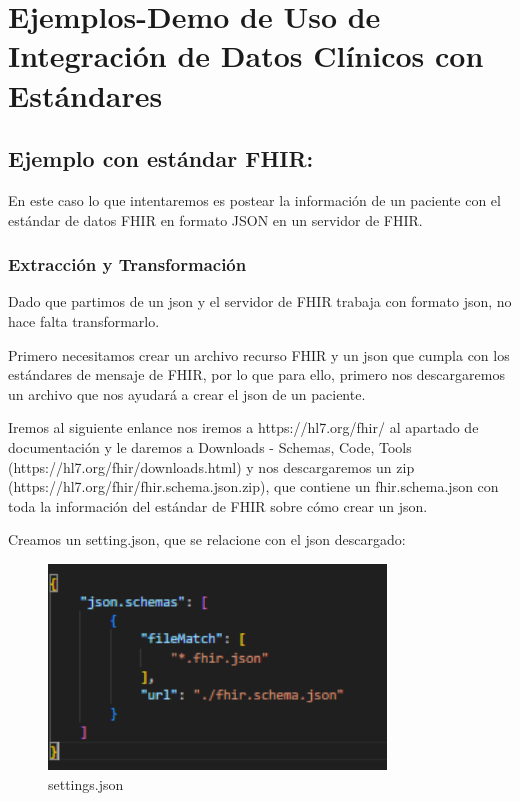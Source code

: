 \documentclass[12pt, a4paper, twoside]{article}
\begin{document}
	
	\section{Ejemplos-Demo de Uso de Integración de Datos Clínicos con Estándares}
	
	
	\subsection{Ejemplo con estándar  FHIR:}
	En este caso lo que intentaremos es postear la información de un paciente con el estándar de datos FHIR en formato JSON en un servidor de  FHIR.
	
	\subsubsection{Extracción y Transformación}
	Dado que partimos de un json y el servidor de FHIR trabaja con formato json, no hace falta transformarlo.
	
	Primero necesitamos crear un archivo recurso FHIR y un json que cumpla con los estándares de mensaje de FHIR, por lo que para ello, primero nos descargaremos un archivo que nos ayudará a crear el json de un paciente. 
	
	Iremos al siguiente enlance nos iremos a https://hl7.org/fhir/ al apartado de documentación y le daremos a Downloads - Schemas, Code, Tools (https://hl7.org/fhir/downloads.html) y nos descargaremos un zip (https://hl7.org/fhir/fhir.schema.json.zip), que contiene un fhir.schema.json con toda la información del estándar de FHIR sobre cómo crear un json.
	
	Creamos un setting.json, que se relacione con el json descargado: 
	
	\begin{figure}[h!]
		\centering
		\includegraphics[width=0.8\textwidth]{image/3.png}
		\caption{settings.json}
		\label{fig:3}
	\end{figure}
	
\end{document}
